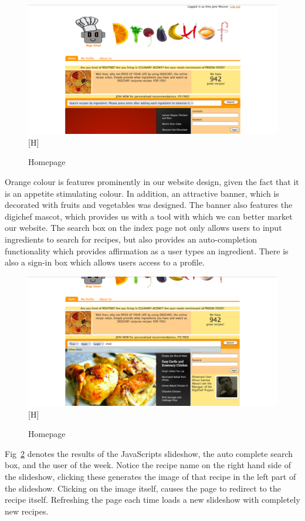 

\begin{figure}[H]
\includegraphics[width=1\textwidth]{result_index}[H]
\caption{Homepage}
\label{fig:result_index}
\end{figure}

Orange colour is features prominently in our website design, given the fact that it is an appetite stimulating colour. In addition, an attractive banner, which is decorated with fruits and vegetables was designed. The banner also features the digichef mascot, which provides us with a tool with which we can better market our website.
The search box on the index page not only allows users to input ingredients to search for recipes, but also provides an auto-completion functionality which provides affirmation as a user types an ingredient. There is also a sign-in box which allows users access to a profile.

\begin{figure}[H]
\includegraphics[width=1\textwidth]{result_index2}[H]
\caption{Homepage}
\label{fig:result_index2}
\end{figure}

Fig~\ref{fig:result_index2} denotes the results of the JavaScripts slideshow, the auto complete search box, and the user of the week. Notice the recipe name on the right hand side of the slideshow, clicking these generates the image of that recipe in the left part of the slideshow. Clicking on the image itself, causes the page to redirect to the recipe itself. Refreshing the page each time loads a new slideshow with completely new recipes.

